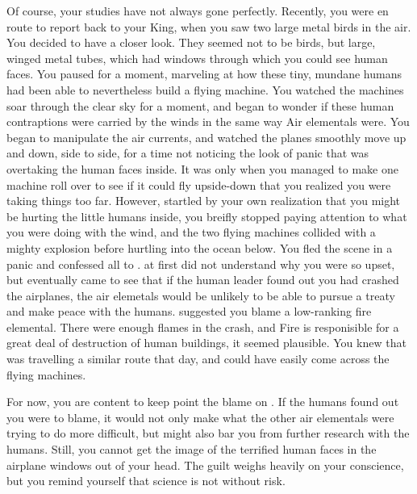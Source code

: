 \documentclass[char]{elementals}
\begin{document}
Of course, your studies have not always gone perfectly.  Recently, you were en route to report back to your King, when you saw two large metal birds in the air.  You decided to have a closer look.  They seemed not to be birds, but large, winged metal tubes, which had windows through which you could see human faces.  You paused for a moment, marveling at how these tiny, mundane humans had been able to nevertheless build a flying machine.  You watched the machines soar through the clear sky for a moment, and began to wonder if these human contraptions were carried by the winds in the same way Air elementals were.  You began to manipulate the air currents, and watched the planes smoothly move up and down, side to side, for a time not noticing the look of panic that was overtaking the human faces inside.  It was only when you managed to make one machine roll over to see if it could fly upside-down that you realized you were taking things too far.  However, startled by your own realization that you might be hurting the little humans inside, you breifly stopped paying attention to what you were doing with the wind, and the two flying machines collided with a mighty explosion before hurtling into the ocean below.  You fled the scene in a panic and confessed all to \cairKing{}.   at first did not understand why you were so upset, but eventually  came to see that if the human leader found out you had crashed the airplanes, the air elemetals would be unlikely to be able to pursue a treaty and make peace with the humans.  \cairKing{} suggested you blame a low-ranking fire elemental.  There were enough flames in the crash, and Fire is responisible for a great deal of destruction of human buildings, it seemed plausible.  You knew that  was travelling a similar route that day, and could have easily come across the flying machines.

For now, you are content to keep point the blame on .  If the humans found out you were to blame, it would not only make what the other air elementals were trying to do more difficult, but might also bar you from further research with the humans.  Still, you cannot get the image of the terrified human faces in the airplane windows out of your head.  The guilt weighs heavily on your conscience, but you remind yourself that science is not without risk.

\end{document}
